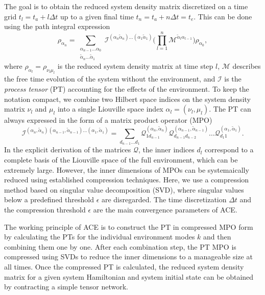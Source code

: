 \documentclass{scrartcl}
\begin{document}
The goal is to obtain the reduced system density matrix discretized on
a time grid $t_l = t_a + l \Delta t$ up to a given final time 
$t_n = t_a + n \Delta t = t_e$.
This can be done using the path integral expression
\begin{equation}
{\rho}_{\alpha_n}=
\sum_{\substack{\alpha_{n-1}\dots\alpha_0 \\
\tilde{\alpha}_n\dots\tilde{\alpha}_1}}
\mathcal{I}^{(\alpha_{n}\tilde{\alpha}_n)\dots(\alpha_1\tilde{\alpha}_1)}
\bigg(\prod_{l=1}^{n}
\mathcal{M}^{\tilde{\alpha}_{l}\alpha_{l-1}} \bigg)
{\rho}_{\alpha_0},
\end{equation}
where ${\rho}_{\alpha_l}={\rho}_{\nu_l \mu_l}$ is the reduced 
system density matrix at time step $l$, $\mathcal{M}$ describes the
free time evolution of the system without the environment, 
and $\mathcal{I}$ is the 
\emph{process tensor} (PT) accounting for the 
effects of the environment.
To keep the notation compact, we combine two Hilbert space indices
on the system density matrix $\nu_l$ and $\mu_l$ into a single 
Liouville space index $\alpha_l=(\nu_l, \mu_l)$.
The PT can always expressed in the form of a matrix product operator (MPO)
%
\begin{equation}
\mathcal{I}^{(\alpha_{n},\tilde{\alpha}_{n})(\alpha_{n-1},\tilde{\alpha}_{n-1})
\dots (\alpha_{1},\tilde{\alpha}_{1})}
= 
\sum_{d_{n-1}\dots d_1}
\mathcal{Q}_{1 d_{n-1}}^{(\alpha_{n},\tilde{\alpha}_{n})}
\mathcal{Q}_{d_{n-1} d_{n-2}}^{(\alpha_{n-1},\tilde{\alpha}_{n-1})}\dots
\mathcal{Q}_{d_1 1}^{(\alpha_{1},\tilde{\alpha}_{1})}.
\end{equation}
In the explicit derivation of the matrices $\mathcal{Q}$, the inner indices
$d_l$ correspond to a complete basis of the Liouville space 
of the full environment, which can be extremely large. However, the inner 
dimensions of MPOs can be systemaically reduced using established compression 
techniques.
Here, we use a compression method based on singular value decomposition (SVD),
where singular values below a predefined threshold $\epsilon$ are disregarded.
The time discretization $\Delta t$ and the compression threshold $\epsilon$
are the main convergence parameters of ACE.

The working principle of ACE is to construct the PT in compressed MPO form
by calculating the PTs for the individual environment modes $k$ 
and then combining them one by one. 
After each combination step, the PT MPO is compressed using
SVDs to reduce the inner dimensions to a manageable size at all times.
Once the compressed PT is calculated,
the reduced system density matrix for a given 
system Hamiltonian and system initial state can be obtained by contracting
a simple tensor network.
\end{document}
